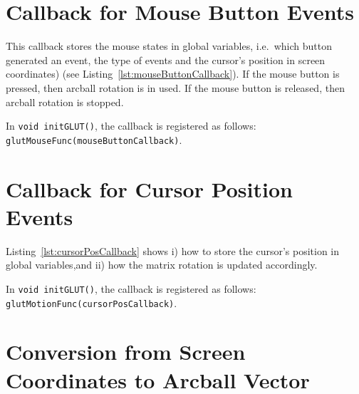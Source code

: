 \documentclass[11pt,oneside,a4paper,final]{article}
\begin{document}
\section{Callback for Mouse Button Events}
\label{mouseButtonCallback}

This callback stores the mouse states in global variables, i.e.~which button generated an event, the type of events and the cursor's position in screen coordinates) (see Listing~\ref{lst:mouseButtonCallback}).
If the mouse button is pressed, then arcball rotation is in used. 
If the mouse button is released, then arcball rotation is stopped.

In \verb+void initGLUT()+, the callback is registered as follows:
\verb+glutMouseFunc(mouseButtonCallback)+.

\begin{center}

\end{center}


\section{Callback for Cursor Position Events}
\label{cursorPosCallback}

Listing~\ref{lst:cursorPosCallback} shows i) how to store the cursor's position in global variables,and ii) 
how the matrix rotation is updated accordingly.

In \verb+void initGLUT()+, the callback is registered as follows:
\verb+glutMotionFunc(cursorPosCallback)+.

\begin{center}

\end{center}


\section{Conversion from Screen Coordinates to Arcball Vector}
\label{getArcballVector}
\end{document}
